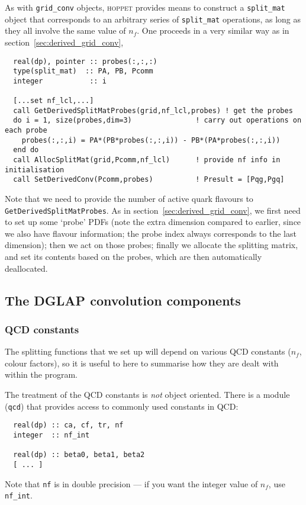 \documentclass[12pt]{article}
\newcommand{\hoppet}{\textsc{hoppet}\xspace}
\newcommand{\ttt}[1]{\texttt{#1}}
\begin{document}
As with \ttt{grid\_conv} objects, \hoppet provides means to construct
a \ttt{split\_mat} object that corresponds to an arbitrary series of
\ttt{split\_mat} operations, as long as they all involve the same
value of $n_f$. One proceeds in a very similar way as
in section~\ref{sec:derived_grid_conv},
\begin{lstlisting}
  real(dp), pointer :: probes(:,:,:)
  type(split_mat)  :: PA, PB, Pcomm
  integer           :: i

  [...set nf_lcl,...]
  call GetDerivedSplitMatProbes(grid,nf_lcl,probes) ! get the probes
  do i = 1, size(probes,dim=3)               ! carry out operations on each probe
    probes(:,:,i) = PA*(PB*probes(:,:,i)) - PB*(PA*probes(:,:,i))
  end do
  call AllocSplitMat(grid,Pcomm,nf_lcl)      ! provide nf info in initialisation
  call SetDerivedConv(Pcomm,probes)          ! Presult = [Pqg,Pgq]
\end{lstlisting}
Note that we need to provide the number of active quark flavours
to \ttt{GetDerivedSplitMatProbes}.
As in section~\ref{sec:derived_grid_conv}, we first need to set up
some `probe' PDFs (note the extra dimension compared to earlier, since
we also have flavour information; the probe index always corresponds
to the last dimension); then we act on those probes; finally we
allocate the splitting matrix, and set its contents based on the
probes, which are then automatically deallocated.



\subsection{The DGLAP convolution components}
\label{sec:dglap_holder}

\subsubsection{QCD constants}
\label{sec:qcd}

The splitting functions that we set up will depend on various QCD
constants ($n_f$, colour factors), so it is useful to here to
summarise how they are dealt with within the program.

The treatment of the QCD constants is \emph{not} object oriented.
There is a module (\ttt{qcd}) that provides access to commonly used
constants in QCD:
\begin{lstlisting}
  real(dp) :: ca, cf, tr, nf
  integer  :: nf_int
  
  real(dp) :: beta0, beta1, beta2
  [ ... ]
\end{lstlisting}
Note that \ttt{nf} is in double precision
 --- if you want the integer value of $n_f$, use \ttt{nf\_int}. 
\end{document}
